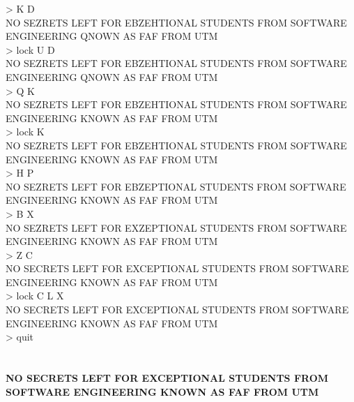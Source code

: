 \documentclass[12pt]{article}
\begin{document}
> K D\\
NO SEZRETS LEFT FOR EBZEHTIONAL STUDENTS FROM SOFTWARE ENGINEERING QNOWN AS FAF FROM UTM\\
> lock U D\\
NO SEZRETS LEFT FOR EBZEHTIONAL STUDENTS FROM SOFTWARE ENGINEERING QNOWN AS FAF FROM UTM\\
> Q K\\
NO SEZRETS LEFT FOR EBZEHTIONAL STUDENTS FROM SOFTWARE ENGINEERING KNOWN AS FAF FROM UTM\\
> lock K\\
NO SEZRETS LEFT FOR EBZEHTIONAL STUDENTS FROM SOFTWARE ENGINEERING KNOWN AS FAF FROM UTM\\
> H P\\
NO SEZRETS LEFT FOR EBZEPTIONAL STUDENTS FROM SOFTWARE ENGINEERING KNOWN AS FAF FROM UTM\\
> B X\\
NO SEZRETS LEFT FOR EXZEPTIONAL STUDENTS FROM SOFTWARE ENGINEERING KNOWN AS FAF FROM UTM\\
> Z C\\
NO SECRETS LEFT FOR EXCEPTIONAL STUDENTS FROM SOFTWARE ENGINEERING KNOWN AS FAF FROM UTM\\
> lock C L X\\
NO SECRETS LEFT FOR EXCEPTIONAL STUDENTS FROM SOFTWARE ENGINEERING KNOWN AS FAF FROM UTM\\
> quit \\\\\\

\textbf{NO SECRETS LEFT FOR EXCEPTIONAL STUDENTS FROM SOFTWARE ENGINEERING KNOWN AS FAF FROM UTM}
\end{document}

